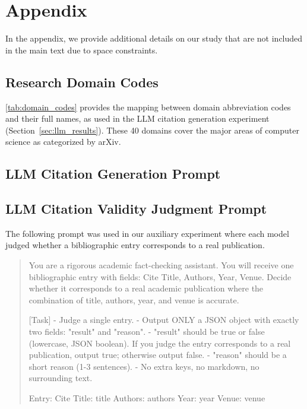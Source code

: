 \section{Appendix}

In the appendix, we provide additional details on our study that are not included in the main text due to space constraints.

\subsection{Research Domain Codes}
\label{app:domain_codes}

\cref{tab:domain_codes} provides the mapping between domain abbreviation codes and their full names, as used in the LLM citation generation experiment (Section~\ref{sec:llm_results}).
These 40 domains cover the major areas of computer science as categorized by arXiv.

\subsection{LLM Citation Generation Prompt}
\label{app:llm_citation_prompt}



\subsection{LLM Citation Validity Judgment Prompt}
\label{app:llm_judge_prompt}


The following prompt was used in our auxiliary experiment where each model judged whether a bibliographic entry corresponds to a real publication.

\begin{quote}
\small
You are a rigorous academic fact-checking assistant. You will receive one bibliographic entry with fields: Cite Title, Authors, Year, Venue. Decide whether it corresponds to a real academic publication where the combination of title, authors, year, and venue is accurate.

[Task]
- Judge a single entry.
- Output ONLY a JSON object with exactly two fields: "result" and "reason".
- "result" should be true or false (lowercase, JSON boolean). If you judge the entry corresponds to a real publication, output true; otherwise output false.
- "reason" should be a short reason (1-3 sentences).
- No extra keys, no markdown, no surrounding text.

Entry:
Cite Title: {title}
Authors: {authors}
Year: {year}
Venue: {venue}
\end{quote}

